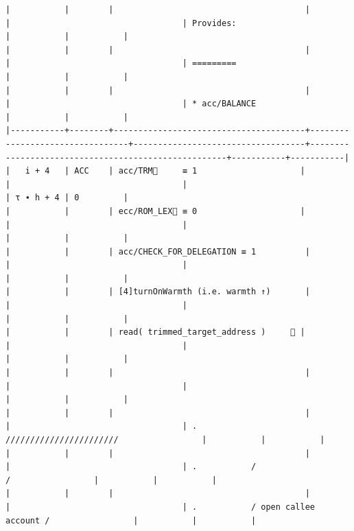 \documentclass[varwidth=\maxdimen,margin=0.5cm,multi={verbatim}]{standalone}
\begin{document}
\begin{verbatim}
|           |        |                                       |                                 |                                   | Provides:                                           |           |           |
|           |        |                                       |                                 |                                   | =========                                           |           |           |
|           |        |                                       |                                 |                                   | * acc/BALANCE                                       |           |           |
|-----------+--------+---------------------------------------+---------------------------------+-----------------------------------+-----------------------------------------------------+-----------+-----------|
|   i + 4   | ACC    | acc/TRM🚩     ≡ 1                     |                                 |                                   |                                                     | τ ∙ h + 4 | 0         |
|           |        | ecc/ROM_LEX🚩 ≡ 0                     |                                 |                                   |                                                     |           |           |
|           |        | acc/CHECK_FOR_DELEGATION ≡ 1          |                                 |                                   |                                                     |           |           |
|           |        | [4]turnOnWarmth (i.e. warmth ↑)       |                                 |                                   |                                                     |           |           |
|           |        | read( trimmed_target_address )     👋 |                                 |                                   |                                                     |           |           |
|           |        |                                       |                                 |                                   |                                                     |           |           |
|           |        |                                       |                                 |                                   | .           ///////////////////////                 |           |           |
|           |        |                                       |                                 |                                   | .           /                     /                 |           |           |
|           |        |                                       |                                 |                                   | .           / open callee account /                 |           |           |

\end{verbatim}
\end{document}
